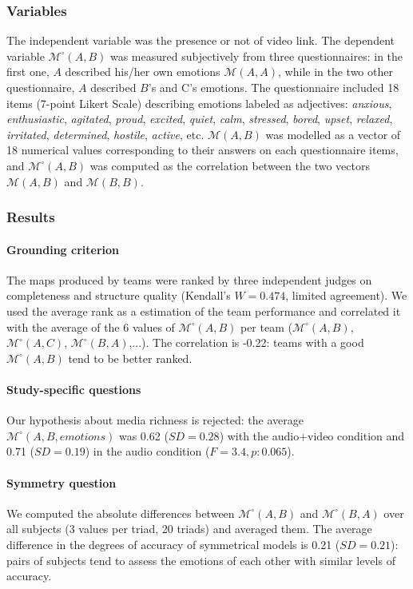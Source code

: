 \documentclass[natbib]{svjour3}
\newcommand{\gmodel}[2]{{$\mathcal{M}(#1, #2)$}}
\newcommand{\Model}[3]{{$\mathcal{M}^{\circ}(#1, #2, #3)$}}
\newcommand{\gModel}[2]{{$\mathcal{M}^{\circ}(#1, #2)$}}
\begin{document}
\subsubsection*{Variables}

The independent variable was the presence or not of video link. The dependent
variable \gModel{A}{B} was measured subjectively from three questionnaires: in the first
one, $A$ described his/her own emotions \gmodel{A}{A}, while in the two other
questionnaire, $A$ described $B$'s and C's emotions. The questionnaire included 18
items (7-point Likert Scale) describing emotions labeled as adjectives:
\emph{anxious}, \emph{enthusiastic}, \emph{agitated}, \emph{proud},
\emph{excited}, \emph{quiet}, \emph{calm}, \emph{stressed}, \emph{bored},
\emph{upset}, \emph{relaxed}, \emph{irritated}, \emph{determined},
\emph{hostile}, \emph{active}, etc. \gmodel{A}{B} was modelled as a vector
of 18 numerical values corresponding to their answers on each
questionnaire items, and \gModel{A}{B} was computed as the correlation between the
two vectors \gmodel{A}{B} and \gmodel{B}{B}.

\subsubsection*{Results}

\paragraph{Grounding criterion} The maps produced by teams were ranked by three
independent judges on completeness and structure quality (Kendall's $W=0.474$,
limited agreement). We used the average rank as a estimation of the team
performance and correlated it with the average of the 6 values of \gModel{A}{B}
per team (\gModel{A}{B}, \gModel{A}{C}, \gModel{B}{A},...). The correlation is
-0.22: teams with a good \gModel{A}{B} tend to be better ranked. 

\paragraph{Study-specific questions} Our hypothesis about media richness is
rejected: the average \Model{A}{B}{emotions} was 0.62 ($SD = 0.28$) with the
audio+video condition and 0.71 ($SD = 0.19$) in the audio condition ($F=3.4, p:
0.065$).

\paragraph{Symmetry question} We computed the absolute differences between
\gModel{A}{B} and \gModel{B}{A} over all subjects (3 values per triad, 20
triads) and averaged them. The average difference in the degrees of accuracy of
symmetrical models is 0.21 ($SD= 0.21$): pairs of subjects tend to assess the
emotions of each other with similar levels of accuracy.
\end{document}
